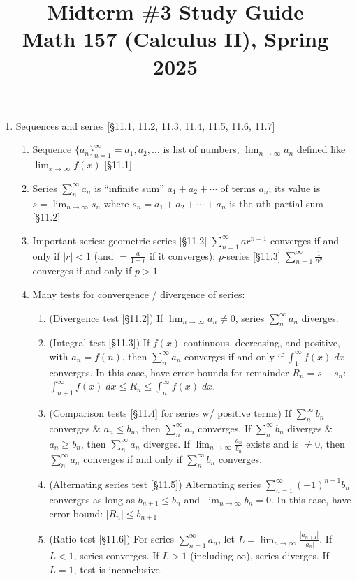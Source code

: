 \documentclass[11pt]{article}
\title{Midterm \#3 Study Guide \\ Math 157 (Calculus II), Spring 2025}
\date{}
\begin{document}
\maketitle

\thispagestyle{empty}

\vspace{-2cm}

\begin{enumerate}
\item Sequences and series [\S11.1, 11.2, 11.3, 11.4, 11.5, 11.6, 11.7]
\begin{enumerate}
\item Sequence $\{a_n\}_{n=1}^{\infty} = a_1,a_2,\ldots$ is list of numbers, $\displaystyle \lim_{n\to \infty} a_n$ defined like $\displaystyle \lim_{x \to \infty} f(x)$ [\S11.1]
\item Series $\sum_{n}^{\infty} a_n$ is ``infinite sum'' $a_1+a_2+\cdots$ of terms $a_n$; its value is $s=\lim_{n\to\infty} s_n$ where $s_n = a_1+a_2+\cdots+a_n$ is the $n$th partial sum [\S11.2]
\item Important series: geometric series [\S11.2] $\sum_{n=1}^{\infty} ar^{n-1}$ converges if and only if $|r|<1$ (and $=\frac{a}{1-r}$ if it converges); $p$-series [\S11.3] $\sum_{n=1}^{\infty}\frac{1}{n^p}$ converges if and only if $p > 1$ 
\item Many tests for convergence / divergence of series:
\begin{enumerate}
\item (Divergence test [\S11.2]) If $\lim_{n\to \infty} a_n \neq 0$, series $\sum_{n}^{\infty} a_n$ diverges.
\item (Integral test [\S11.3]) If $f(x)$ continuous, decreasing, and positive, with $a_n = f(n)$, then $\sum_{n}^{\infty} a_n$ converges if and only if $\int_{1}^{\infty} f(x) \; dx$ converges. In this case, have error bounds for remainder $R_n = s-s_n$: $\int_{n+1}^{\infty} f(x) \; dx \leq R_n \leq \int_{n}^{\infty} f(x) \; dx$.
\item (Comparison tests [\S11.4] for series w/ positive terms) If $\sum_{n}^{\infty} b_n$ converges \& $a_n \leq b_n$, then $\sum_{n}^{\infty} a_n$ converges. If $\sum_{n}^{\infty} b_n$ diverges \& $a_n \geq b_n$, then $\sum_{n}^{\infty} a_n$ diverges. If $\lim_{n\to\infty} \frac{a_n}{b_n}$ exists and is $\neq 0$, then $\sum_{n}^{\infty} a_n$ converges if and only if $\sum_{n}^{\infty} b_n$ converges.
\item (Alternating series test [\S11.5]) Alternating series $\sum_{n=1}^{\infty} (-1)^{n-1} b_n$ converges as long as $b_{n+1} \leq b_n$ and $\lim_{n\to\infty} b_n=0$. In this case, have error bound: $|R_n| \leq b_{n+1}$.
\item (Ratio test [\S11.6]) For series $\sum_{n=1}^{\infty} a_n$, let $L = \lim_{n\to \infty} \frac{|a_{n+1}|}{|a_n|}$. If $L < 1$, series converges. If $L > 1$ (including $\infty$), series diverges. If $L=1$, test is inconclusive.
\end{enumerate}
\end{enumerate}


\end{enumerate}
\end{document}
